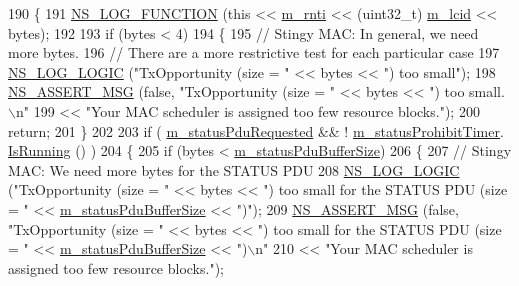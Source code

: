 \begin{DoxyCode}
190 \{
191   \hyperlink{log-macros-disabled_8h_a90b90d5bad1f39cb1b64923ea94c0761}{NS\_LOG\_FUNCTION} (\textcolor{keyword}{this} << \hyperlink{classns3_1_1LteRlc_a48ab0a78e7f2687337075b1c8832df70}{m\_rnti} << (uint32\_t) \hyperlink{classns3_1_1LteRlc_a051085e9b27883e7ba4b98ad7242fd8a}{m\_lcid} << bytes);
192 
193   \textcolor{keywordflow}{if} (bytes < 4)
194     \{
195       \textcolor{comment}{// Stingy MAC: In general, we need more bytes.}
196       \textcolor{comment}{// There are a more restrictive test for each particular case}
197       \hyperlink{group__logging_ga88acd260151caf2db9c0fc84997f45ce}{NS\_LOG\_LOGIC} (\textcolor{stringliteral}{"TxOpportunity (size = "} << bytes << \textcolor{stringliteral}{") too small"});
198       \hyperlink{assert_8h_aff5ece9066c74e681e74999856f08539}{NS\_ASSERT\_MSG} (\textcolor{keyword}{false}, \textcolor{stringliteral}{"TxOpportunity (size = "} << bytes << \textcolor{stringliteral}{") too small.\(\backslash\)n"}
199                          << \textcolor{stringliteral}{"Your MAC scheduler is assigned too few resource blocks."});
200       \textcolor{keywordflow}{return};
201     \}
202 
203   \textcolor{keywordflow}{if} ( \hyperlink{classns3_1_1LteRlcAm_afd4ce0824f86cfb394f0492383f98a3b}{m\_statusPduRequested} && ! \hyperlink{classns3_1_1LteRlcAm_af32da019a7f906fd00bba0f15927817a}{m\_statusProhibitTimer}.
      \hyperlink{classns3_1_1EventId_aabf8476d1a080c199ea0c6aa9ccea372}{IsRunning} () )
204     \{
205       \textcolor{keywordflow}{if} (bytes < \hyperlink{classns3_1_1LteRlcAm_a722cecd1994be0d51675dea14b187623}{m\_statusPduBufferSize})
206         \{
207           \textcolor{comment}{// Stingy MAC: We need more bytes for the STATUS PDU}
208           \hyperlink{group__logging_ga88acd260151caf2db9c0fc84997f45ce}{NS\_LOG\_LOGIC} (\textcolor{stringliteral}{"TxOpportunity (size = "} << bytes << \textcolor{stringliteral}{") too small for the STATUS PDU
       (size = "} << \hyperlink{classns3_1_1LteRlcAm_a722cecd1994be0d51675dea14b187623}{m\_statusPduBufferSize} << \textcolor{stringliteral}{")"});
209           \hyperlink{assert_8h_aff5ece9066c74e681e74999856f08539}{NS\_ASSERT\_MSG} (\textcolor{keyword}{false}, \textcolor{stringliteral}{"TxOpportunity (size = "} << bytes << \textcolor{stringliteral}{") too small for the
       STATUS PDU (size = "} << \hyperlink{classns3_1_1LteRlcAm_a722cecd1994be0d51675dea14b187623}{m\_statusPduBufferSize} << \textcolor{stringliteral}{")\(\backslash\)n"}
210                              << \textcolor{stringliteral}{"Your MAC scheduler is assigned too few resource blocks."});

\end{DoxyCode}
